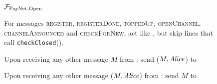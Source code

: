 \begin{figure}[!htbp]
  \begin{systembox}{$\mathcal{F}_{\mathrm{PayNet}}{}_{\mathrm{, Open}}$}
    \begin{algorithmic}[1]
      \State For messages \textsc{register}, \textsc{registerDone},
      \textsc{toppedUp}, \textsc{openChannel}, \textsc{channelAnnounced} and
      \textsc{checkForNew}, act like \fpaynet{}, but skip lines that call
      \texttt{checkClosed}().
      \Statex

      \State Upon receiving any other message $M$ from \alice:
      \Indent
          \State send ($M, \mathit{Alice}$) to \simulator
        \EndIf
      \EndIndent
      \Statex

      \State Upon receiving any other message ($M, \mathit{Alice}$) from \simulator:
      \Indent
          \State send $M$ to \alice
        \EndIf
      \EndIndent
    \end{algorithmic}
  \end{systembox}
  \caption{}
  \label{alg:proof:fpaynet:open}
\end{figure}

